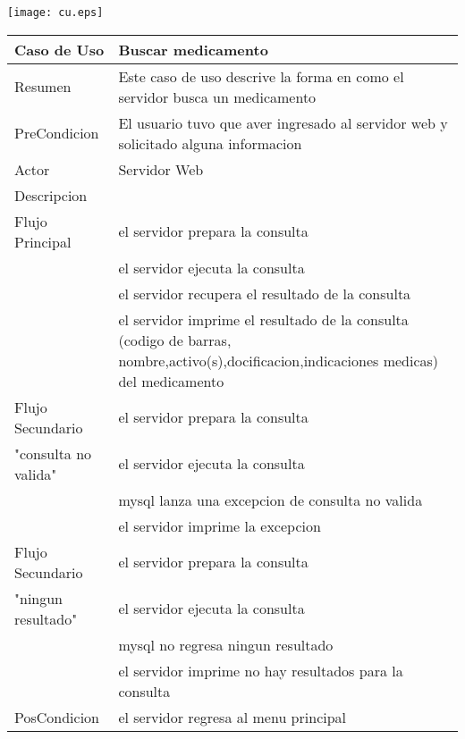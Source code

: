 \documentclass{book}
\begin{document}
	\frontmatter
		
		\begin{minipage}{0.15\textwidth}
	        	\texttt{[image: cu.eps]}
		\end{minipage}

	\begin{table}[H]
		\centering
		\begin{tabular}{p{3cm} p{11cm}}
			\hline
				Caso de Uso & Buscar medicamento\\
			\hline 
				Resumen & Este caso de uso descrive la forma en como el servidor busca un medicamento\\
			\hline
				PreCondicion&El usuario tuvo que aver ingresado al servidor web y solicitado alguna informacion\\
			\hline
				Actor & Servidor Web\\
			\hline
				Descripcion&\\
				Flujo Principal&el servidor prepara la consulta
					\\&el servidor ejecuta la consulta
					\\&el servidor recupera el resultado de la consulta
					\\&el servidor imprime el resultado de la consulta (codigo de barras, nombre,activo(s),docificacion,indicaciones medicas) del medicamento\\
			\hline
				Flujo Secundario&el servidor prepara la consulta\\
				"consulta no valida"&el servidor ejecuta la consulta
				\\&mysql lanza una excepcion de consulta no valida
				\\&el servidor imprime la excepcion\\
			\hline
				Flujo Secundario&el servidor prepara la consulta\\
				"ningun resultado"&el servidor ejecuta la consulta
				\\&mysql no regresa ningun resultado
				\\&el servidor imprime no hay resultados para la consulta\\
			\hline
				PosCondicion&el servidor regresa al menu principal\\
			\hline
		\end{tabular}
	\end{table}
\end{document}
